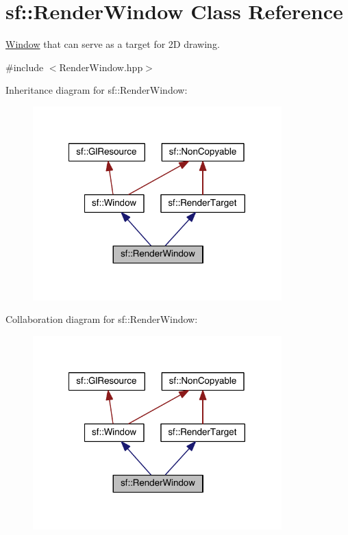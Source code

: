 \hypertarget{classsf_1_1_render_window}{\section{sf\-:\-:Render\-Window Class Reference}
\label{classsf_1_1_render_window}
}


\hyperlink{classsf_1_1_window}{Window} that can serve as a target for 2\-D drawing.  




{\ttfamily \#include $<$Render\-Window.\-hpp$>$}



Inheritance diagram for sf\-:\-:Render\-Window\-:
\nopagebreak
\begin{figure}[H]
\begin{center}
\leavevmode
\includegraphics[width=272pt]{classsf_1_1_render_window__inherit__graph}
\end{center}
\end{figure}


Collaboration diagram for sf\-:\-:Render\-Window\-:
\nopagebreak
\begin{figure}[H]
\begin{center}
\leavevmode
\includegraphics[width=272pt]{classsf_1_1_render_window__coll__graph}
\end{center}
\end{figure}
